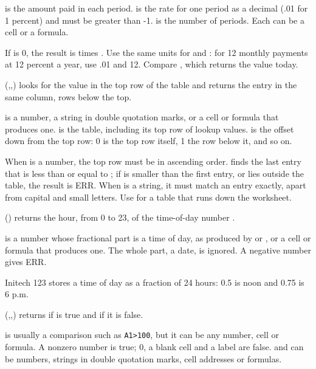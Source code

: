 is the amount paid in each period.  is the rate for one period as a decimal (.01 for 1 percent) and must be greater than -1.  is the number of periods. Each can be a cell or a formula.

If  is 0, the result is  times . Use the same units for  and : for 12 monthly payments at 12 percent a year, use .01 and 12. Compare , which returns the value today.

\Examples
{}

(,,) looks for the value  in the top row of the table  and returns the entry in the same column,  rows below the top.

 is a number, a string in double quotation marks, or a cell or formula that produces one.  is the table, including its top row of lookup values.  is the offset down from the top row: 0 is the top row itself, 1 the row below it, and so on.

When  is a number, the top row must be in ascending order.  finds the last entry that is less than or equal to ; if  is smaller than the first entry, or  lies outside the table, the result is ERR. When  is a string, it must match an entry exactly, apart from capital and small letters. Use  for a table that runs down the worksheet.

\Examples
{}

() returns the hour, from 0 to 23, of the time-of-day number .

 is a number whose fractional part is a time of day, as produced by  or , or a cell or formula that produces one. The whole part, a date, is ignored. A negative number gives ERR.

Initech 123 stores a time of day as a fraction of 24 hours: 0.5 is noon and 0.75 is 6 p.m.

\Examples
{}

(,,) returns  if  is true and  if it is false.

 is usually a comparison such as \texttt{A1>100}, but it can be any number, cell or formula. A nonzero number is true; 0, a blank cell and a label are false.  and  can be numbers, strings in double quotation marks, cell addresses or formulas.

